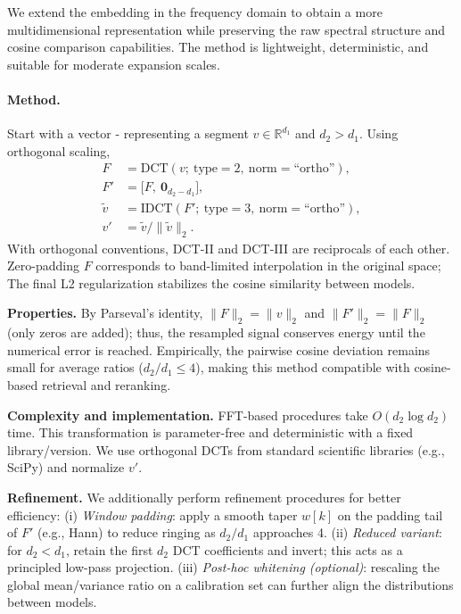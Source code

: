 \documentclass[10pt,twocolumn,letterpaper]{article}
\begin{document}
We extend the embedding in the frequency domain to obtain a more multidimensional representation while preserving the raw spectral structure and cosine comparison capabilities. The method is lightweight, deterministic, and suitable for moderate expansion scales.

\paragraph{Method.}
Start with a vector - representing a segment $v\in\mathbb{R}^{d_1}$ and $d_2>d_1$. Using orthogonal scaling,
\begin{align*}
F &= \mathrm{DCT}(v;\ \text{type}=2,\ \text{norm}=\text{``ortho''}), \\
F' &= \big[F,\ \mathbf{0}_{d_2-d_1}\big], \\
\tilde v &= \mathrm{IDCT}(F';\ \text{type}=3,\ \text{norm}=\text{``ortho''}), \\
v' &= \tilde v \big/ \lVert \tilde v\rVert_2.
\end{align*}
With orthogonal conventions, DCT‑II and DCT‑III are reciprocals of each other. Zero-padding $F$ corresponds to band-limited interpolation in the original space; The final L2 regularization stabilizes the cosine similarity between models.

\textbf{Properties.} By Parseval's identity, $\lVert F\rVert_2=\lVert v\rVert_2$ and $\lVert F'\rVert_2=\lVert F\rVert_2$ (only zeros are added); thus, the resampled signal conserves energy until the numerical error is reached. Empirically, the pairwise cosine deviation remains small for average ratios ($d_2/d_1\!\le\!4$), making this method compatible with cosine-based retrieval and reranking.

\vspace{0.5em}
\textbf{Complexity and implementation.} FFT-based procedures take $O(d_2\log d_2)$ time. This transformation is parameter-free and deterministic with a fixed library/version. We use orthogonal DCTs from standard scientific libraries (e.g., SciPy) and normalize $v'$.

\vspace{0.5em}
\textbf{Refinement.} We additionally perform refinement procedures for better efficiency: (i) \textit{Window padding}: apply a smooth taper $w[k]$ on the padding tail of $F'$ (e.g., Hann) to reduce ringing as $d_2/d_1$ approaches 4. (ii) \textit{Reduced variant}: for $d_2<d_1$, retain the first $d_2$ DCT coefficients and invert; this acts as a principled low-pass projection. (iii) \textit{Post-hoc whitening (optional)}: rescaling the global mean/variance ratio on a calibration set can further align the distributions between models.
\end{document}

